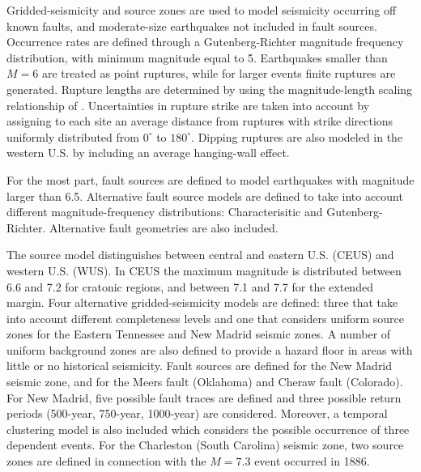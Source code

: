 Gridded-seismicity and source zones are used to model seismicity occurring off
known faults, and moderate-size earthquakes not included in fault sources.
Occurrence rates are defined through a Gutenberg-Richter magnitude frequency
distribution, with minimum magnitude equal to 5. Earthquakes smaller than $M=6$
are treated as point ruptures, while for larger events finite ruptures are
generated. Rupture lengths are determined by using the magnitude-length scaling
relationship of \citet{wells1994}. Uncertainties in rupture strike are taken
into account by assigning to each site an average distance from ruptures with
strike directions uniformly distributed from $0^{\circ}$ to $180^{\circ}$.
Dipping ruptures are also modeled in the western U.S. by including an average
hanging-wall effect.

For the most part, fault sources are defined to model earthquakes with magnitude
larger than 6.5. Alternative fault source models are defined to take into
account different magnitude-frequency distributions: Characterisitic
\citep{schwartscoppersmith1984} and Gutenberg-Richter. Alternative fault
geometries are also included.

The source model distinguishes between central and eastern U.S. (CEUS) and
western U.S. (WUS). In CEUS the maximum magnitude is distributed between 6.6 and
7.2 for cratonic regions, and between 7.1 and 7.7 for the extended margin. Four
alternative gridded-seismicity models are defined: three that take into account
different completeness levels and one that considers uniform source zones for
the Eastern Tennessee and New Madrid seismic zones. A number of uniform
background zones are also defined to provide a hazard floor in areas with little
or no historical seismicity. Fault sources are defined for the New Madrid
seismic zone, and for the Meers fault (Oklahoma) and Cheraw fault (Colorado).
For New Madrid, five possible fault traces are defined and three possible return
periods (500-year, 750-year, 1000-year) are considered. Moreover, a temporal
clustering model is also included which considers the possible occurrence of
three dependent events. For the Charleston (South Carolina) seismic zone, two
source zones are defined in connection with the $M=7.3$ event occurred in 1886.


